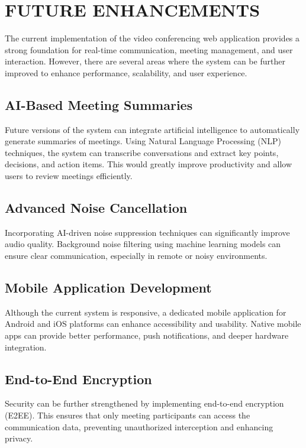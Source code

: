 \chapter{FUTURE ENHANCEMENTS}

The current implementation of the video conferencing web application provides a strong foundation for real-time communication, meeting management, and user interaction. However, there are several areas where the system can be further improved to enhance performance, scalability, and user experience.

\section{AI-Based Meeting Summaries}

Future versions of the system can integrate artificial intelligence to automatically generate summaries of meetings. Using Natural Language Processing (NLP) techniques, the system can transcribe conversations and extract key points, decisions, and action items. This would greatly improve productivity and allow users to review meetings efficiently.

\section{Advanced Noise Cancellation}

Incorporating AI-driven noise suppression techniques can significantly improve audio quality. Background noise filtering using machine learning models can ensure clear communication, especially in remote or noisy environments.

\section{Mobile Application Development}

Although the current system is responsive, a dedicated mobile application for Android and iOS platforms can enhance accessibility and usability. Native mobile apps can provide better performance, push notifications, and deeper hardware integration.

\section{End-to-End Encryption}

Security can be further strengthened by implementing end-to-end encryption (E2EE). This ensures that only meeting participants can access the communication data, preventing unauthorized interception and enhancing privacy.

